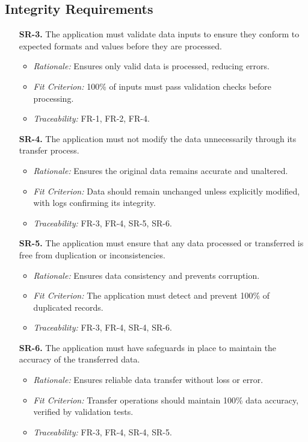 \documentclass[12pt]{article}
\begin{document}
\subsection{Integrity Requirements}
\begin{enumerate}
  \item[\textbf{SR-3.}] The application must validate data inputs to ensure they
  conform to expected formats and values before they are processed.
  \begin{itemize}
    \item \textit{Rationale:} Ensures only valid data is processed, reducing
    errors.
    \item \textit{Fit Criterion:} 100\% of inputs must pass validation checks
    before processing.
    \item \textit{Traceability:} FR-1, FR-2, FR-4.
  \end{itemize}

  \item[\textbf{SR-4.}] The application must not modify the data unnecessarily
  through its transfer process.
  \begin{itemize}
    \item \textit{Rationale:} Ensures the original data remains accurate and
    unaltered.
    \item \textit{Fit Criterion:} Data should remain unchanged unless explicitly
    modified, with logs confirming its integrity.
    \item \textit{Traceability:} FR-3, FR-4, SR-5, SR-6.
  \end{itemize}

  \item[\textbf{SR-5.}] The application must ensure that any data processed or
  transferred is free from duplication or inconsistencies.
  \begin{itemize}
    \item \textit{Rationale:} Ensures data consistency and prevents corruption.
    \item \textit{Fit Criterion:} The application must detect and prevent 100\%
    of duplicated records.
    \item \textit{Traceability:} FR-3, FR-4, SR-4, SR-6.
  \end{itemize}

  \item[\textbf{SR-6.}] The application must have safeguards in place to
  maintain the accuracy of the transferred data.
  \begin{itemize}
    \item \textit{Rationale:} Ensures reliable data transfer without loss or
    error.
    \item \textit{Fit Criterion:} Transfer operations should maintain 100\% data
    accuracy, verified by validation tests.
    \item \textit{Traceability:} FR-3, FR-4, SR-4, SR-5.
  \end{itemize}
\end{enumerate}
\end{document}
